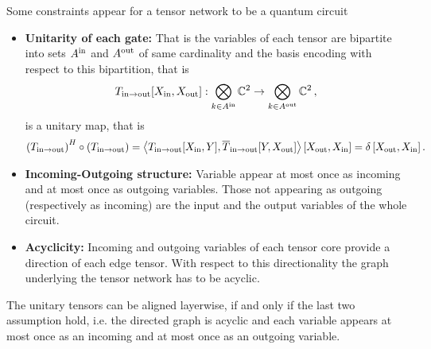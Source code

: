 \documentclass[aps,onecolumn,nofootinbib,pra]{article}
\begin{document}
    Some constraints appear for a tensor network to be a quantum circuit
    \begin{itemize}
        \item \textbf{Unitarity of each gate:} That is the variables of each tensor are bipartite into sets $A^{\mathrm{in}}$ and $A^{\mathrm{out}}$ of same cardinality and the basis encoding with respect to this bipartition, that is
        \begin{align*}
            T_{\mathrm{in} \rightarrow \mathrm{out}}[X_{\mathrm{in}},X_{\mathrm{out}}] : \bigotimes_{k\in A^{\mathrm{in}}} \mathbb{C}^2 \rightarrow \bigotimes_{k\in A^{\mathrm{out}}} \mathbb{C}^2  \, ,
        \end{align*}
        is a unitary map, that is
        \begin{align*}
            \left(T_{\mathrm{in} \rightarrow \mathrm{out}}\right)^H \circ \left(T_{\mathrm{in} \rightarrow \mathrm{out}}\right)
            = \left\langle 
                T_{\mathrm{in} \rightarrow \mathrm{out}}[X_{\mathrm{in}},Y],
                \overline{T}_{\mathrm{in} \rightarrow \mathrm{out}}[Y,X_{\mathrm{out}}]
            \right\rangle \left[ X_{\mathrm{out}},X_{\mathrm{in}} \right]
            = \delta\left[X_{\mathrm{out}},X_{\mathrm{in}}\right].
        \end{align*}
        \item \textbf{Incoming-Outgoing structure:} Variable appear at most once as incoming and at most once as outgoing variables.
        Those not appearing as outgoing (respectively as incoming) are the input and the output variables of the whole circuit.
        \item \textbf{Acyclicity:} Incoming and outgoing variables of each tensor core provide a direction of each edge tensor. With respect to this directionality the graph underlying the tensor network has to be acyclic.
    \end{itemize}

    The unitary tensors can be aligned layerwise, if and only if the last two assumption hold, i.e. the directed graph is acyclic and each variable appears at most once as an incoming and at most once as an outgoing variable.
    
    
    
\end{document}
